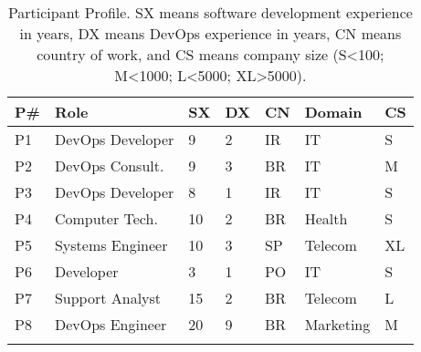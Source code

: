\begin{table}[t]
\centering
\caption{Participant Profile. SX means software development experience in years,
DX means DevOps experience in years, CN means country of work, and CS means
company size (S\textless100; M\textless1000; L\textless5000; XL\textgreater5000).}
\label{participant_table}
\begin{tabular}{|p{0.4cm}|p{2.6cm}|p{0.4cm}|p{0.45cm}|p{0.5cm}|p{1.3cm}|p{0.3cm}|} \toprule \centering
\textbf{P\#}          & \textbf{Role}
       & \textbf{SX} & \textbf{DX} & \textbf{CN}   & \textbf{Domain}    & \multicolumn{1}{l}{\textbf{CS}} \\ \midrule \centering
P1                   & DevOps Developer      & 9            & 2           & IR            & IT                 & S                               \\ \centering

P2                   & DevOps Consult.       & 9            & 3           & BR            & IT                 & M                               \\ \centering

P3                   & DevOps Developer      & 8            & 1           & IR            & IT                 & S                               \\ \centering

P4                   & Computer Tech.        & 10           & 2           & BR            & Health             & S                               \\ \centering

P5                   & Systems Engineer      & 10           & 3           & SP            & Telecom            & XL                              \\ \centering

P6                   & Developer             & 3            & 1           & PO            & IT                 & S                               \\ \centering

P7                   & Support Analyst       & 15           & 2           & BR            & Telecom            & L                               \\ \centering

P8                   & DevOps Engineer       & 20           & 9           & BR            & Marketing              & M                               \\ \centering


\end{tabular}
\end{table}
